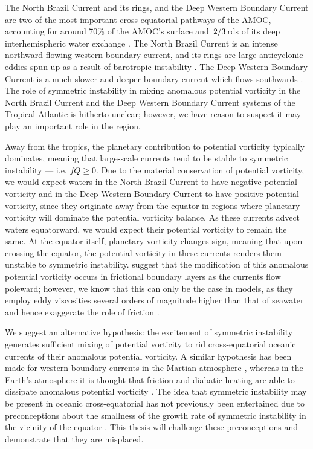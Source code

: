 
The North Brazil Current and its rings, and the Deep Western Boundary Current are two of the most important cross-equatorial pathways of the AMOC, accounting for around 70\% of the AMOC's surface \citep{Fratantoni2000} and $\flatfrac{2}{3}$rds of its deep interhemispheric water exchange \citep{Richardson1999, Bower2019}. The North Brazil Current is an intense northward flowing western boundary current, and its rings are large anticyclonic eddies spun up as a result of barotropic instability \citep{Johns1998,Castelao2011}. The Deep Western Boundary Current is a much slower and deeper boundary current which flows southwards \citep{Schott2005}. The role of symmetric instability in mixing anomalous potential vorticity in the North Brazil Current and the Deep Western Boundary Current systems of the Tropical Atlantic is hitherto unclear; however, we have reason to suspect it may play an important role in the region. 

Away from the tropics, the planetary contribution to potential vorticity typically dominates, meaning that large-scale currents tend to be stable to symmetric instability --- i.e. $fQ \geq 0$. Due to the material conservation of potential vorticity, we would expect waters in the North Brazil Current to have negative potential vorticity and in the Deep Western Boundary Current to have positive potential vorticity, since they originate away from the equator in regions where planetary vorticity will dominate the potential vorticity balance. As these currents advect waters equatorward, we would expect their potential vorticity to remain the same. At the equator itself, planetary vorticity changes sign, meaning that upon crossing the equator, the potential vorticity in these currents renders them unstable to symmetric instability. \citet{Edwards1998I, Edwards1998II} suggest that the modification of this anomalous potential vorticity occurs in frictional boundary layers as the currents flow poleward; however, we know that this can only be the case in models, as they employ eddy viscosities several orders of magnitude higher than that of seawater and hence exaggerate the role of friction \citep{Akuetevi2015}.

We suggest an alternative hypothesis: the excitement of symmetric instability generates sufficient mixing of potential vorticity to rid cross-equatorial oceanic currents of their anomalous potential vorticity. A similar hypothesis has been made for western boundary currents in the Martian atmosphere \citep{Joshi1994}, whereas in the Earth's atmosphere it is thought that friction and diabatic heating are able to dissipate anomalous potential vorticity \citep{Rodwell1995}. The idea that symmetric instability may be present in oceanic cross-equatorial has not previously been entertained due to preconceptions about the smallness of the growth rate of symmetric instability in the vicinity of the equator \citep{Edwards1998I, Haine1998}. This thesis will challenge these preconceptions and demonstrate that they are misplaced.

